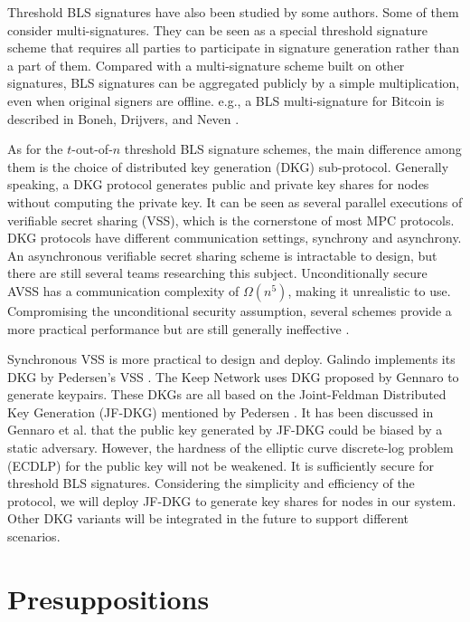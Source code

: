 \documentclass[11pt]{article}
\begin{document}
Threshold BLS signatures have also been studied by some authors. Some of them consider multi-signatures. They can be seen as a special threshold signature scheme that requires all parties to participate in signature generation rather than a part of them. Compared with a multi-signature scheme built on other signatures, BLS signatures can be aggregated publicly by a simple multiplication, even when original signers are offline. e.g., a BLS multi-signature for Bitcoin is described in Boneh, Drijvers, and Neven \cite{boneh2018compact}. 

As for the $t$-out-of-$n$ threshold BLS signature schemes, the main difference among them is the choice of distributed key generation (DKG) sub-protocol. Generally speaking, a DKG protocol generates public and private key shares for nodes without computing the private key. It can be seen as several parallel executions of verifiable secret sharing (VSS), which is the cornerstone of most MPC protocols. DKG protocols have different communication settings, synchrony and asynchrony. An asynchronous verifiable secret sharing scheme is intractable to design, but there are still several teams researching this subject. Unconditionally secure AVSS has a communication complexity of $\Omega(n^5)$, making it unrealistic to use. Compromising the unconditional security assumption, several schemes provide a more practical performance but are still generally ineffective \cite{kate2012distributed}.

Synchronous VSS is more practical to design and deploy. Galindo \cite{galindo2021fully} implements its DKG by Pedersen's VSS \cite{pedersen1991threshold}. The Keep Network \cite{keep2022doc} uses DKG proposed by Gennaro \cite{gennaro2007secure} to generate keypairs. These DKGs are all based on the Joint-Feldman Distributed Key Generation (JF-DKG) mentioned by Pedersen \cite{pedersen1991non}. It has been discussed in Gennaro et al. \cite{gennaro2007secure} that the public key generated by JF-DKG could be biased by a static adversary. However, the hardness of the elliptic curve discrete-log problem (ECDLP) for the public key will not be weakened. It is sufficiently secure for threshold BLS signatures. Considering the simplicity and efficiency of the protocol, we will deploy JF-DKG to generate key shares for nodes in our system. Other DKG variants will be integrated in the future to support different scenarios.

\section{Presuppositions}
\end{document}
